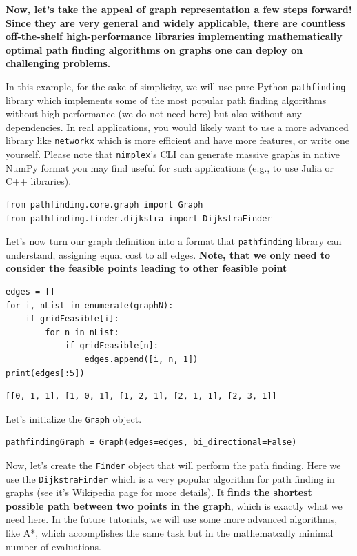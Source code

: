 \textbf{Now, let's take the appeal of graph representation a few steps
forward! Since they are very general and widely applicable, there are
countless off-the-shelf high-performance libraries implementing
mathematically optimal path finding algorithms on graphs one can deploy
on challenging problems.}

In this example, for the sake of simplicity, we will use pure-Python
\texttt{pathfinding} library which implements some of
the most popular path finding algorithms without high performance (we do
not need here) but also without any dependencies. In real applications,
you would likely want to use a more advanced library like
\texttt{networkx} which is more efficient and have more
features, or write one yourself. Please note that
\texttt{nimplex}'s CLI can generate massive graphs in
native NumPy format you may find useful for such applications (e.g., to
use Julia or C++ libraries).

\begin{verbatim}
from pathfinding.core.graph import Graph
from pathfinding.finder.dijkstra import DijkstraFinder
\end{verbatim}

Let's now turn our graph definition into a format that
\texttt{pathfinding} library can understand, assigning
equal cost to all edges. \textbf{Note, that we only need to consider the
feasible points leading to other feasible point}

\begin{verbatim}
edges = []
for i, nList in enumerate(graphN):
    if gridFeasible[i]:
        for n in nList:
            if gridFeasible[n]:
                edges.append([i, n, 1])
print(edges[:5])
\end{verbatim}

\begin{verbatim}
[[0, 1, 1], [1, 0, 1], [1, 2, 1], [2, 1, 1], [2, 3, 1]]
\end{verbatim}

Let's initialize the \texttt{Graph} object.

\begin{verbatim}
pathfindingGraph = Graph(edges=edges, bi_directional=False)
\end{verbatim}

Now, let's create the \texttt{Finder} object that will
perform the path finding. Here we use the
\texttt{DijkstraFinder} which is a very popular
algorithm for path finding in graphs (see
\href{https://en.wikipedia.org/wiki/Dijkstra's_algorithm}{it's Wikipedia
page} for more details). It \textbf{finds the shortest possible path
between two points in the graph}, which is exactly what we need here. In
the future tutorials, we will use some more advanced algorithms, like
A*, which accomplishes the same task but in the mathematcally minimal
number of evaluations.

